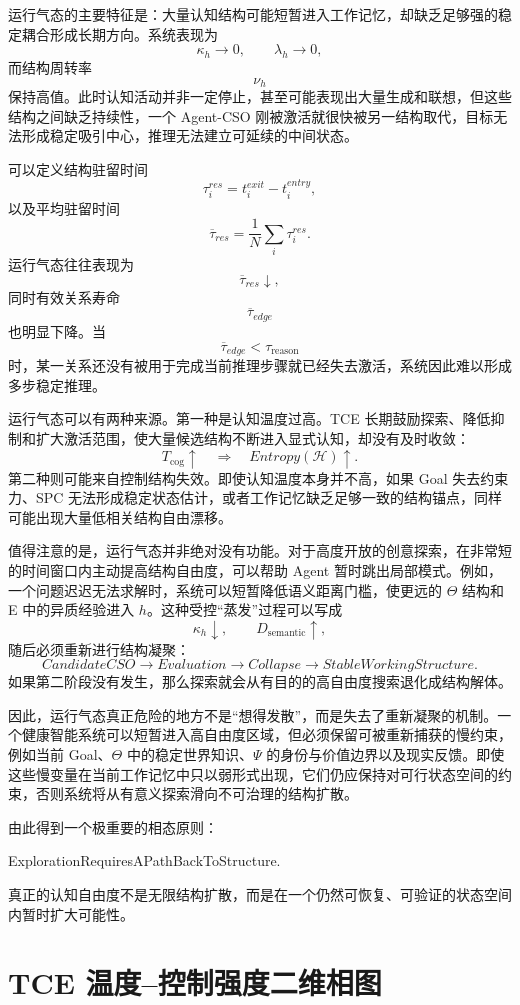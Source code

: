 运行气态的主要特征是：大量认知结构可能短暂进入工作记忆，却缺乏足够强的稳定耦合形成长期方向。系统表现为
\[
\kappa_h\rightarrow 0,\qquad
\lambda_h\rightarrow 0,
\]
而结构周转率
\[
\nu_h
\]
保持高值。此时认知活动并非一定停止，甚至可能表现出大量生成和联想，但这些结构之间缺乏持续性，一个 Agent-CSO 刚被激活就很快被另一结构取代，目标无法形成稳定吸引中心，推理无法建立可延续的中间状态。

可以定义结构驻留时间
\[
\tau_i^{res}
=
t_i^{exit}-t_i^{entry},
\]
以及平均驻留时间
\[
\overline{\tau}_{res}
=
\frac{1}{N}
\sum_i\tau_i^{res}.
\]
运行气态往往表现为
\[
\overline{\tau}_{res}\downarrow,
\]
同时有效关系寿命
\[
\overline{\tau}_{edge}
\]
也明显下降。当
\[
\overline{\tau}_{edge}
<
\tau_{\mathrm{reason}}
\]
时，某一关系还没有被用于完成当前推理步骤就已经失去激活，系统因此难以形成多步稳定推理。

运行气态可以有两种来源。第一种是认知温度过高。TCE 长期鼓励探索、降低抑制和扩大激活范围，使大量候选结构不断进入显式认知，却没有及时收敛：
\[
T_{\mathrm{cog}}\uparrow
\quad\Rightarrow\quad
Entropy(\mathcal H)\uparrow.
\]
第二种则可能来自控制结构失效。即使认知温度本身并不高，如果 Goal 失去约束力、SPC 无法形成稳定状态估计，或者工作记忆缺乏足够一致的结构锚点，同样可能出现大量低相关结构自由漂移。

值得注意的是，运行气态并非绝对没有功能。对于高度开放的创意探索，在非常短的时间窗口内主动提高结构自由度，可以帮助 Agent 暂时跳出局部模式。例如，一个问题迟迟无法求解时，系统可以短暂降低语义距离门槛，使更远的 $\Theta$ 结构和 E 中的异质经验进入 $h$。这种受控“蒸发”过程可以写成
\[
\kappa_h\downarrow,\qquad
D_{\mathrm{semantic}}\uparrow,
\]
随后必须重新进行结构凝聚：
\[
CandidateCSO
\rightarrow
Evaluation
\rightarrow
Collapse
\rightarrow
StableWorkingStructure.
\]
如果第二阶段没有发生，那么探索就会从有目的的高自由度搜索退化成结构解体。

因此，运行气态真正危险的地方不是“想得发散”，而是失去了重新凝聚的机制。一个健康智能系统可以短暂进入高自由度区域，但必须保留可被重新捕获的慢约束，例如当前 Goal、$\Theta$ 中的稳定世界知识、$\Psi$ 的身份与价值边界以及现实反馈。即使这些慢变量在当前工作记忆中只以弱形式出现，它们仍应保持对可行状态空间的约束，否则系统将从有意义探索滑向不可治理的结构扩散。

由此得到一个极重要的相态原则：
\begin{statementbox}
ExplorationRequiresAPathBackToStructure.
\end{statementbox}
真正的认知自由度不是无限结构扩散，而是在一个仍然可恢复、可验证的状态空间内暂时扩大可能性。

\section{TCE 温度--控制强度二维相图}

